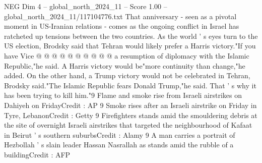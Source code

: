 \begin{textsample}{NEG Dim 4 – global\_north\_2024\_11 – Score 1.00 – global\_north\_2024\_11/117104776.txt}
That anniversary - seen as a pivotal moment in US-Iranian relations - comes as the ongoing conflict in Israel has ratcheted up tensions between the two countries.
As the world ' s eyes turn to the US election, Brodsky said that Tehran would likely prefer a Harris victory."If you have Vice @ @ @ @ @ @ @ @ @ @ a resumption of diplomacy with the Islamic Republic,"he said.
A Harris victory would be"more continuity than change,"he added.
On the other hand, a Trump victory would not be celebrated in Tehran, Brodsky said."The Islamic Republic fears Donald Trump,"he said.
That ' s why it has been trying to kill him."9 Flame and smoke rise from Israeli airstrikes on Dahiyeh on FridayCredit : AP 9 Smoke rises after an Israeli airstrike on Friday in Tyre, LebanonCredit : Getty 9 Firefighters stands amid the smouldering debris at the site of overnight Israeli airstrikes that targeted the neighbourhood of Kafaat in Beirut ' s southern suburbsCredit : Alamy 9 A man carries a portrait of Hezbollah ' s slain leader Hassan Nasrallah as stands amid the rubble of a buildingCredit : AFP

\end{textsample}
